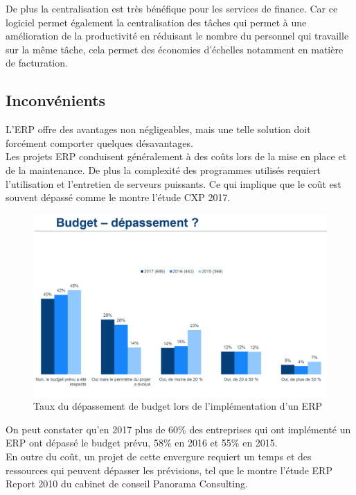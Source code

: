        De plus la centralisation est très bénéfique pour les services de finance. Car ce logiciel permet également la centralisation des tâches qui permet à une amélioration de la productivité en réduisant le nombre du personnel qui travaille sur la même tâche, cela permet des économies d’échelles notamment en matière de facturation.

    \subsection{Inconvénients}
        L’ERP offre des avantages non négligeables, mais une telle solution doit forcément comporter quelques désavantages.\\

        Les projets ERP conduisent généralement à des coûts lors de la mise en place et de la maintenance. De plus la complexité des programmes utilisés requiert l’utilisation et l’entretien de serveurs puissants. Ce qui implique que le coût est souvent dépassé comme le montre l’étude CXP 2017.\\

        \begin{figure}[H]
            \centering
                \includegraphics[scale=0.4]{chapitre2/graph-depassement-budget.jpg}
            \caption{Taux du dépassement de budget lors de l’implémentation d’un ERP}
        \end{figure} 

        On peut constater qu’en 2017 plus de 60\% des entreprises qui ont implémenté un ERP ont dépassé le budget prévu, 58\% en 2016 et 55\% en 2015.\\

        En outre du coût, un projet de cette envergure requiert un temps et des ressources qui peuvent dépasser les prévisions, tel que le montre l’étude ERP Report 2010 du cabinet de conseil Panorama Consulting.\\

